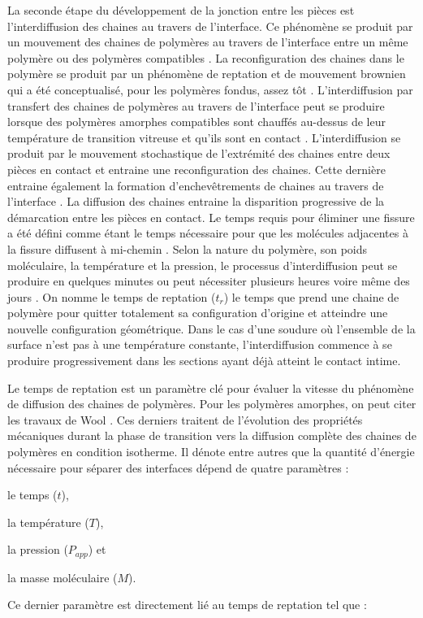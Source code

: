 La seconde étape du développement de la jonction entre les pièces est l'interdiffusion des chaines au travers de l'interface. 
Ce phénomène se produit par un mouvement des chaines de polymères au travers de l'interface entre un même polymère ou des polymères compatibles \cite{Jud1981b}. 
La reconfiguration des chaines dans le polymère se produit par un phénomène de reptation et de mouvement brownien qui a été conceptualisé, pour les polymères fondus, assez tôt \cite{DeGennes1971,Edwards1978b,Klein1978,Daoud1979}. 
L'interdiffusion par transfert des chaines de polymères au travers de l'interface peut se produire lorsque des polymères amorphes compatibles sont chauffés au-dessus de leur température de transition vitreuse et qu'ils sont en contact \cite{Jud1981a,Prager1981a}. 
L'interdiffusion se produit par le mouvement stochastique de l'extrémité des chaines entre deux pièces en contact et entraine une reconfiguration des chaines. 
Cette dernière entraine également la formation d'enchevêtrements de chaines au travers de l'interface \cite{Wool1983}. 
La diffusion des chaines entraine la disparition progressive de la démarcation entre les pièces en contact. 
Le temps requis pour éliminer une fissure a été défini comme étant le temps nécessaire pour que les molécules adjacentes à la fissure diffusent à mi-chemin \cite{Prager1981a}.
Selon la nature du polymère, son poids moléculaire, la température et la pression, le processus d'interdiffusion peut se produire en quelques minutes ou peut nécessiter plusieurs heures voire même des jours \cite{Prager1981a}. 
On nomme le temps de reptation ($t_r$) le temps que prend une chaine de polymère pour quitter totalement sa configuration d'origine et atteindre une nouvelle configuration géométrique. 
Dans le cas d'une soudure où l'ensemble de la surface n'est pas à une température constante, l'interdiffusion commence à se produire progressivement dans les sections ayant déjà atteint le contact intime. 

Le temps de reptation est un paramètre clé pour évaluer la vitesse du phénomène de diffusion des chaines de polymères. 
Pour les polymères amorphes, on peut citer les travaux de Wool \cite{Wool1983,Wool1989}. 
Ces derniers traitent de l'évolution des propriétés mécaniques durant la phase de transition vers la diffusion complète des chaines de polymères en condition isotherme. 
Il dénote entre autres que la quantité d'énergie nécessaire pour séparer des interfaces dépend de quatre paramètres : \begin{inparaenum}[(1)]
	\item le temps ($t$), 
	\item la température ($T$), 
	\item la pression ($P_{app}$) et
	\item la masse moléculaire ($M$). 
\end{inparaenum}
Ce dernier paramètre est directement lié au temps de reptation tel que \cite{DeGennes1971}: 

